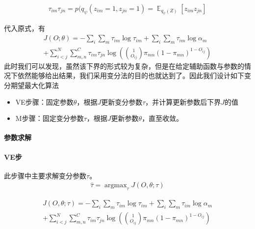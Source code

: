\begin{equation}\begin{aligned}
\tau_{im}\tau_{jn}=p(q_\psi(z_{im}=1,z_{jn}=1) =\mathop{\mathbb{E}}_{q_\psi(Z)}[z_{im}z_{jn}]
\end{aligned}\end{equation}

代入原式，有
\begin{equation}\begin{aligned}
J(O;\theta)=-\sum_i\sum_m\tau_{im} \log \tau_{im} +\sum_i\sum_m \tau_{im} \log \alpha_m \\+\sum_{i<j}^N\sum_{m,n}^C\tau_{im}\tau_{jn}\log ( \binom{1}{O_{ij}}\pi_{mn}(1-\pi_{mn})^{1-O_{ij}})
\end{aligned}\end{equation}
此时我们可以发现，虽然该下界的形式较为复杂，但是在给定辅助函数与参数的情况下依然能够给出结果，我们采用变分法的目的也就达到了。因此我们设计如下变分期望最大化算法
\begin{itemize}
    \item VE步骤：固定参数$\theta$，根据$J$更新变分参数$\tau$，并计算更新参数后下界$J$的值
    \item M步骤：固定变分参数$\tau$，根据$J$更新参数$\theta$，直至收敛。
\end{itemize}

\paragraph{参数求解}
\paragraph*{VE步}此步骤中主要求解变分参数$\tau$。
\begin{equation}\begin{aligned}
\hat{\tau}=\mathop{\arg\max}_\tau J(O,\theta;\tau)
\end{aligned}\end{equation}

\begin{equation}\begin{aligned}
J(O,\theta;\tau)=-\sum_i\sum_m\tau_{im} \log \tau_{im} +\sum_i\sum_m \tau_{im} \log \alpha_m\\ +\sum_{i<j}^N\sum_{m,n}^C\tau_{im}\tau_{jn}\log ( \binom{1}{O_{ij}}\pi_{mn}(1-\pi_{mn})^{1-O_{ij}})
\end{aligned}\end{equation}

